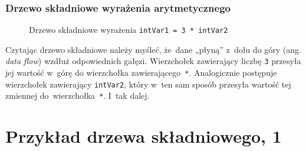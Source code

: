 \documentclass[10pt,t]{beamer}
\begin{document}
\begin{frame}
  \frametitle{Drzewo składniowe wyrażenia arytmetycznego}


  \begin{figure}


    \caption{Drzewo składniowe wyrażenia \texttt{intVar1 = 3 * intVar2}}

    \label{fig:Scheme-of-CPU}

  \end{figure}





  Czytając drzewo składniowe należy myśleć, że~dane „płyną” z~dołu do góry
  (ang. \textit{data flow}) wzdłuż odpowiednich gałęzi. Wierzchołek
  zawierający liczbę \texttt{3} przesyła jej wartość w~górę do wierzchołka
  zawierającego~\texttt{*}. Analogicznie postępuje wierzchołek zawierający
  \texttt{intVar2}, który w~ten sam sposób przesyła wartość tej zmiennej
  do~wierzchołka~\texttt{*}. I~tak dalej.

\end{frame}










\section{Przykład drzewa składniowego, 1}
\end{document}

